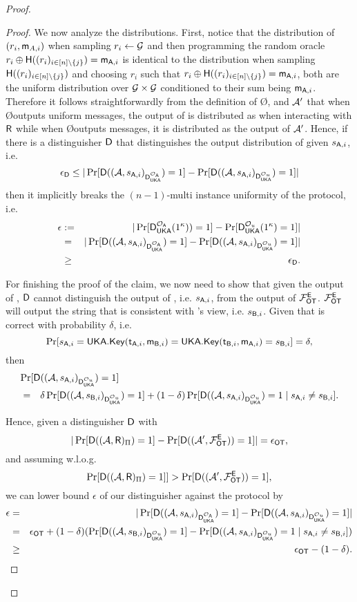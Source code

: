 \begin{proof}
\begin{proof}
We now analyze the distributions. 
First, notice that the distribution of $(r_i,\mathsf{m}_{A,i})$ when sampling $r_i\leftarrow\mathcal{G}$ and then programming the random oracle $r_i\oplus\mathsf{H}((r_i)_{i\in[n]\setminus \{j\}})=\mathsf{m}_{\mathsf{A},i}$ is identical to the distribution when sampling $\mathsf{H}((r_i)_{i\in[n]\setminus \{j\}})$ and choosing $r_i$  such that $r_i\oplus\mathsf{H}((r_i)_{i\in[n]\setminus \{j\}})=\mathsf{m}_{\mathsf{A},i}$, both are the uniform distribution over $\mathcal{G}\times\mathcal{G}$ conditioned to their sum being $\mathsf{m}_{\mathsf{A},i}$. Therefore it follows straightforwardly from the definition of \O, \rec and $\mathcal{A}'$ that when \O outputs uniform messages, the output of \Adv is distributed as when interacting with $\mathsf{R}$ while when \O outputs \UKA messages, it is distributed as the output of $\mathcal{A}'$. Hence, if there is a distinguisher $\mathsf D$ that distinguishes the output distribution of \Adv given $s_{\mathsf{A},i}$, i.e.
$$
\epsilon_{\mathsf D}\leq |\Pr[\mathsf D((\mathcal{A},s_{\mathsf{A},i})_{\mathsf D_{\mathsf{UKA}}^{\mathcal{O}_\mathsf{A}}})=1]-\Pr[\mathsf D((\mathcal{A},s_{\mathsf{A},i})_{\mathsf D_{\mathsf{UKA}}^{\mathcal{O}_u}})=1]|
$$
then it implicitly breaks the $(n-1)$-multi instance uniformity of the \UKA protocol, i.e. 
\begin{eqnarray*}
\epsilon&:=& |\Pr[\mathsf D_{\mathsf{UKA}}^{\mathcal{O}_{\mathsf{A}}}(1^\kappa))=1] -\Pr[ \mathsf D_{\mathsf{UKA}}^{\mathcal{O}_u}(1^\kappa)=1]|\\
&=&|\Pr[\mathsf D((\mathcal{A},s_{\mathsf{A},i})_{\mathsf D_{\mathsf{UKA}}^{\mathcal{O}_{\mathsf{A}}}})=1] -\Pr[ \mathsf D((\mathcal{A},s_{\mathsf{A},i})_{\mathsf D_{\mathsf{UKA}}^{\mathcal{O}_{u}}})=1]|\\
&\geq & \epsilon_{\mathsf D}.
\end{eqnarray*}

For finishing the proof of the claim, we now need to show that given the output of \Adv, $\mathsf D$ cannot distinguish the output of \rec, i.e. $s_{\mathsf{A},i}$,  from the output of $\mathcal{F}_{\mathsf{OT}}^\mathsf{E}$. $\mathcal{F}_{\mathsf{OT}}^\mathsf{E}$ will output the string that is consistent with \send's view, i.e. $s_{\mathsf{B},i}$.
Given that \UKA is correct with probability $\delta$, i.e. 
$$
\Pr[s_{\mathsf{A},i}=\mathsf{UKA}.\mathsf{Key}(\mathsf{t}_{\mathsf{A},i},\mathsf{m}_{\mathsf{B},i})=\mathsf{UKA}.\mathsf{Key}(\mathsf{t}_{\mathsf{B},i},\mathsf{m}_{\mathsf{A},i})=s_{\mathsf{B},i}]= \delta, 
$$
then
\begin{eqnarray*}
\lefteqn{\Pr[ \D((\Adv,s_{\A,i})_{\D_{\UKA}^{\O_{u}}})=1]}\\
&=&\delta\Pr[ \D((\Adv,s_{\B,i})_{\D_{\UKA}^{\O_{u}}})=1]+(1-\delta)\Pr[ \D((\Adv,s_{\A,i})_{\D_{\UKA}^{\O_{u}}})=1\mid s_{\A,i}\neq s_{\B,i}].
\end{eqnarray*}

Hence, given a distinguisher $\mathsf D$ with
$$
|\Pr[\mathsf D((\mathcal{A},\mathsf{R})_{\Pi})=1] -\Pr[ \mathsf D((\mathcal{A}',\mathcal{F}_{\mathsf{OT}}^{\mathsf{E}}))=1]|=\epsilon_{\mathsf{OT}},
$$
and assuming w.l.o.g. 
$$
\Pr[\mathsf D((\mathcal{A},\mathsf{R})_{\Pi})=1]]>\Pr[  \mathsf D((\mathcal{A}',\mathcal{F}_{\mathsf{OT}}^\mathsf{E}))=1],
$$
 we can lower bound $\epsilon$ of our distinguisher against the \UKA protocol by
\begin{eqnarray*}
\epsilon &=&|\Pr[\mathsf D((\mathcal{A},s_{\mathsf{A},i})_{\mathsf D_{\mathsf{UKA}}^{\mathcal{O}_{\mathsf{A}}}})=1] -\Pr[ \mathsf D((\mathcal{A},s_{\mathsf{A},i})_{\mathsf D_{\mathsf{UKA}}^{\mathcal{O}_{u}}})=1]|\\
&=& \epsilon_{\mathsf{OT}} +(1-\delta)(\Pr[ \mathsf D((\mathcal{A},s_{\mathsf{B},i})_{\mathsf D_{\mathsf{UKA}}^{\mathcal{O}_{u}}})=1]-\Pr[ \mathsf D((\mathcal{A},s_{\mathsf{A},i})_{\mathsf D_{\mathsf{UKA}}^{\mathcal{O}_{u}}})=1\mid s_{\mathsf{A},i}\neq s_{\mathsf{B},i}])\\
&\geq &\epsilon_{\mathsf{OT}}-(1-\delta).
\end{eqnarray*}
\pe
\end{proof}


\end{proof}
